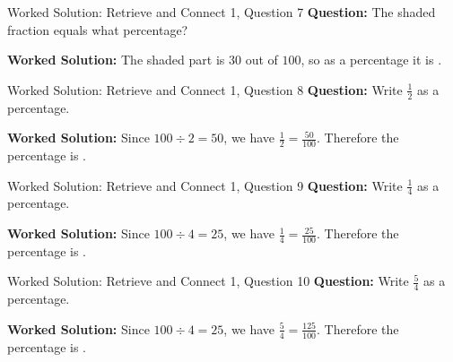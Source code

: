 \documentclass{beamer}
\newcommand{\ablank}[1]{%
  \alt<2>{\textcolor{red}{#1}}{\underline{\phantom{#1}}}%
}
\begin{document}
\begin{frame}[t]{Worked Solution: Retrieve and Connect 1, Question 7}
\textbf{Question:} The shaded fraction equals what percentage?

\smallskip
\textbf{Worked Solution:} The shaded part is \(30\) out of \(100\), so as a percentage it is \ablank{$30\%$}.
\end{frame}

\begin{frame}[t]{Worked Solution: Retrieve and Connect 1, Question 8}
\textbf{Question:} Write \(\frac{1}{2}\) as a percentage.

\smallskip
\textbf{Worked Solution:} Since \(100 \div 2 = 50\), we have \(\frac{1}{2} = \frac{50}{100}\). Therefore the percentage is \ablank{$50\%$}.
\end{frame}

\begin{frame}[t]{Worked Solution: Retrieve and Connect 1, Question 9}
\textbf{Question:} Write \(\frac{1}{4}\) as a percentage.

\smallskip
\textbf{Worked Solution:} Since \(100 \div 4 = 25\), we have \(\frac{1}{4} = \frac{25}{100}\). Therefore the percentage is \ablank{$25\%$}.
\end{frame}

\begin{frame}[t]{Worked Solution: Retrieve and Connect 1, Question 10}
\textbf{Question:} Write \(\frac{5}{4}\) as a percentage.

\smallskip
\textbf{Worked Solution:} Since \(100 \div 4 = 25\), we have \(\frac{5}{4} = \frac{125}{100}\). Therefore the percentage is \ablank{$125\%$}.
\end{frame}
\end{document}
